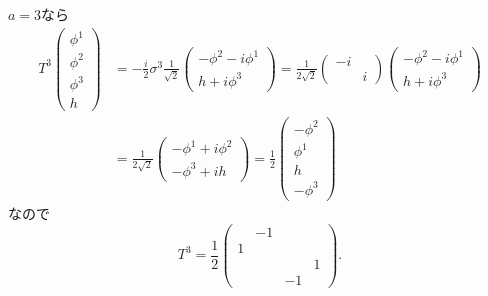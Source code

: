 \(a=3\)なら
\begin{align*}
  T^3
  \begin{pmatrix}
    \phi^1 \\ \phi^2 \\ \phi^3 \\ h
  \end{pmatrix}
  &= - \frac{i}{2} \sigma^3
  \frac{1}{\sqrt{2}}
  \begin{pmatrix}
    -\phi^2 - i \phi^1 \\
    h + i\phi^3
  \end{pmatrix}
  = \frac{1}{2\sqrt{2}}
  \begin{pmatrix}
    -i & \\ & i
  \end{pmatrix}
  \begin{pmatrix}
    -\phi^2 - i \phi^1 \\
    h + i\phi^3
  \end{pmatrix}
  \\
  &= \frac{1}{2\sqrt{2}}
  \begin{pmatrix}
    -\phi^1 + i \phi^2 \\
    -\phi^3 + ih
  \end{pmatrix}
  = \frac{1}{2}
  \begin{pmatrix}
    -\phi^2 \\ \phi^1 \\ h \\ -\phi^3
  \end{pmatrix}
\end{align*}
なので
\[
T^3 = \frac{1}{2}
\begin{pmatrix}
  & -1 & & \\ 1 & & & \\ & & & 1 \\ & & -1 &
\end{pmatrix}
.
\]

